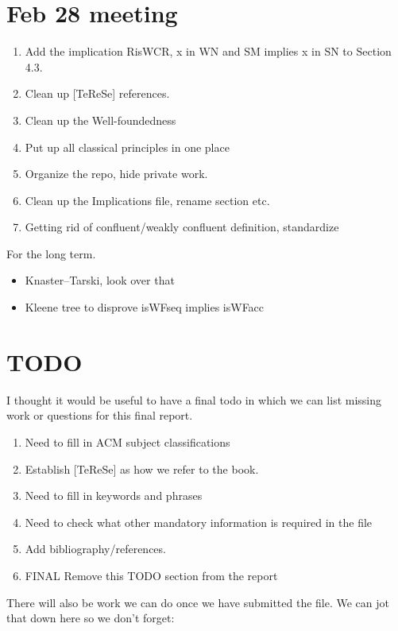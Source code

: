 \documentclass{scrartcl}
\begin{document}
\section{Feb 28 meeting}

\begin{enumerate}
  \item Add the implication RisWCR, x in WN and SM implies x in SN to Section 4.3.
  \item Clean up [TeReSe] references.
  \item Clean up the Well-foundedness
  \item Put up all classical principles in one place
  \item Organize the repo, hide private work.
  \item Clean up the Implications file, rename section etc.
  \item Getting rid of confluent/weakly confluent definition, standardize
\end{enumerate}

For the long term.
\begin{itemize}
  \item Knaster--Tarski, look over that
  \item Kleene tree to disprove isWFseq implies isWFacc
\end{itemize}

\section{TODO}

I thought it would be useful to have a final todo in which we can list missing work or questions for this final report.

\begin{enumerate}
    \item Need to fill in ACM subject classifications
    \item Establish [TeReSe] as how we refer to the book.
    \item Need to fill in keywords and phrases
    \item Need to check what other mandatory information is required in the file
    \item Add bibliography/references.
    \item FINAL Remove this TODO section from the report
\end{enumerate}

There will also be work we can do once we have submitted the file. We can jot that down here so we don't forget:
\end{document}
